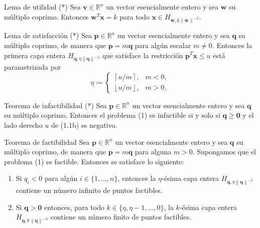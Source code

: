 \documentclass[aspectratio=169,professionalfonts]{beamer}
\newcommand{\R}{\mathbb{R}}
\newcommand{\norm}[1]{\left\lVert #1 \right\rVert}
\renewcommand{\vec}[1]{\boldsymbol{#1}}
\newcommand{\braces}[1]{\lbrace #1 \rbrace}
\newcommand{\clayer}[2]{H_{#1, #2}}
\newcommand{\qlayer}[2]{\clayer{\vec{#1}}{#2\norm{\vec{#1}}^{-2}}}
\newcommand{\floor}[1]{\left\lfloor #1 \right\rfloor}
\newcommand{\ceil}[1]{\left\lceil #1 \right\rceil}
\begin{document}
\begin{frame}
	\begin{block}{Lema de utilidad (*)}
		Sea $\vec{v} \in \R^n$ un vector esencialmente entero y sea $\vec{w}$ su
		múltiplo coprimo. Entonces $\vec{w}^T\vec{x} = k$ para todo $\vec{x} \in
		\qlayer{w}{k}$.
	\end{block}
	\begin{block}{Lema de satisfacción (*)}
		Sea $\vec{p} \in \R^n$ un vector esencialmente entero y sea $\vec{q}$ su
		múltiplo coprimo, de manera que $\vec{p} = m\vec{q}$ para algún escalar $m
		\neq 0$. Entonces la primera capa entera $\qlayer{q}{\eta}$ que satisface
		la restricción $\vec{p}^T\vec{x} \leq u$ está parametrizada por
		\begin{equation*}
			\label{lemma:eq:eta-cases}
			\eta \coloneq \begin{cases}
				\ceil{u/m}, & m < 0, \\
				\floor{u/m}, & m > 0.
			\end{cases}
		\end{equation*}
	\end{block}
\end{frame}

\begin{frame}
	\begin{block}{Teorema de infactibilidad (*)}
		Sea $\vec{p} \in \R^n$ un vector esencialmente entero y sea $\vec{q}$ su
		múltiplo coprimo. Entonces el problema (1) es
		infactible si y solo si $\vec{q} \geq \vec{0}$ y el lado derecho $u$ de
		(1.1b) es negativo. 
	\end{block}
\end{frame}

\begin{frame}
	\begin{block}{Teorema de factibilidad}
	Sea $\vec{p} \in \R^n$ un vector esencialmente entero y sea $\vec{q}$ su
	múltiplo coprimo, de manera que $\vec{p} = m\vec{q}$ para alguna $m > 0$.
	Supongamos que el problema (1) es factible. Entonces
	se satisface lo siguiente:
	\begin{enumerate}
		\item Si $q_i < 0$ para algún $i \in \braces{1, \ldots, n}$, entonces la
			$\eta$-ésima capa entera $\qlayer{q}{\eta}$ contiene un número
			infinito de puntos factibles.
		\item Si $\vec{q} > \vec{0}$ entonces, para todo $k \in \braces{\eta,
			\eta - 1, \ldots, 0}$, la $k$-ésima capa entera $\qlayer{q}{k}$
			contiene un número finito de puntos factibles.
	\end{enumerate}
	\end{block}
\end{frame}
\end{document}
